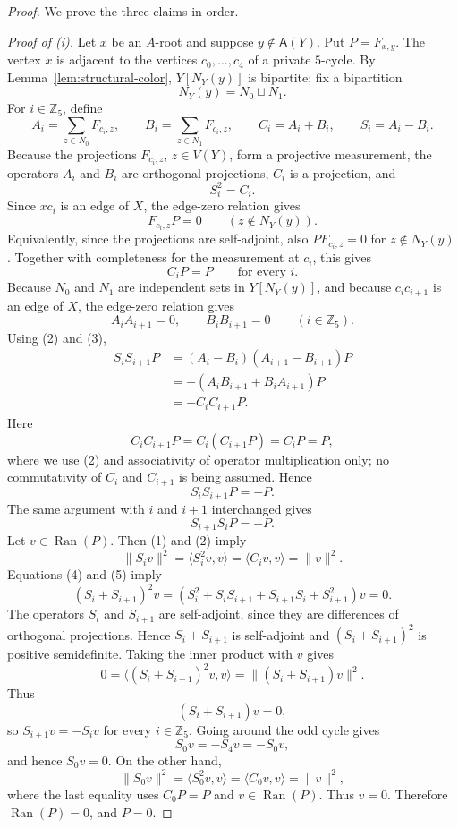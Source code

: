 \documentclass[11pt]{amsart}
\theoremstyle{plain}
\theoremstyle{definition}
\newcommand{\Aset}{\mathsf A}
\begin{document}
\begin{proof}
We prove the three claims in order.

\smallskip
\noindent\emph{Proof of (i).}
Let $x$ be an $A$-root and suppose $y\notin \Aset(Y)$.  Put $P=F_{x,y}$.  The vertex $x$ is adjacent to the vertices $c_0,\ldots,c_4$ of a private $5$-cycle.  By Lemma~\ref{lem:structural-color}, $Y[N_Y(y)]$ is bipartite; fix a bipartition
\[
   N_Y(y)=N_0\sqcup N_1.
\]
For $i\in\mathbb Z_5$, define
\[
   A_i=\sum_{z\in N_0}F_{c_i,z},\qquad
   B_i=\sum_{z\in N_1}F_{c_i,z},\qquad
   C_i=A_i+B_i,\qquad S_i=A_i-B_i.
\]
Because the projections $F_{c_i,z}$, $z\in V(Y)$, form a projective measurement, the operators $A_i$ and $B_i$ are orthogonal projections, $C_i$ is a projection, and
\[
   S_i^2=C_i. \tag{1}
\]
Since $xc_i$ is an edge of $X$, the edge-zero relation gives
\[
   F_{c_i,z}P=0\qquad (z\notin N_Y(y)).
\]
Equivalently, since the projections are self-adjoint, also $PF_{c_i,z}=0$ for $z\notin N_Y(y)$.  Together with completeness for the measurement at $c_i$, this gives
\[
   C_iP=P\qquad\text{for every }i. \tag{2}
\]
Because $N_0$ and $N_1$ are independent sets in $Y[N_Y(y)]$, and because $c_ic_{i+1}$ is an edge of $X$, the edge-zero relation gives
\[
   A_iA_{i+1}=0,
   \qquad
   B_iB_{i+1}=0
   \qquad (i\in\mathbb Z_5). \tag{3}
\]
Using (2) and (3),
\[
\begin{aligned}
   S_iS_{i+1}P
   &=(A_i-B_i)(A_{i+1}-B_{i+1})P\\
   &=-(A_iB_{i+1}+B_iA_{i+1})P\\
   &=-C_iC_{i+1}P.
\end{aligned}
\]
Here
\[
   C_iC_{i+1}P=C_i(C_{i+1}P)=C_iP=P,
\]
where we use (2) and associativity of operator multiplication only; no commutativity of $C_i$ and $C_{i+1}$ is being assumed.  Hence
\[
   S_iS_{i+1}P=-P. \tag{4}
\]
The same argument with $i$ and $i+1$ interchanged gives
\[
   S_{i+1}S_iP=-P. \tag{5}
\]
Let $v\in\operatorname{Ran}(P)$.  Then (1) and (2) imply
\[
   \|S_iv\|^2=\langle S_i^2v,v\rangle=\langle C_iv,v\rangle=\|v\|^2.
\]
Equations (4) and (5) imply
\[
   (S_i+S_{i+1})^2v
   =(S_i^2+S_iS_{i+1}+S_{i+1}S_i+S_{i+1}^2)v=0.
\]
The operators $S_i$ and $S_{i+1}$ are self-adjoint, since they are differences of orthogonal projections.  Hence $S_i+S_{i+1}$ is self-adjoint and $(S_i+S_{i+1})^2$ is positive semidefinite.  Taking the inner product with $v$ gives
\[
   0=\langle (S_i+S_{i+1})^2v,v\rangle
    =\|(S_i+S_{i+1})v\|^2.
\]
Thus
\[
   (S_i+S_{i+1})v=0,
\]
so $S_{i+1}v=-S_iv$ for every $i\in\mathbb Z_5$.  Going around the odd cycle gives
\[
   S_0v=-S_4v=-S_0v,
\]
and hence $S_0v=0$.  On the other hand,
\[
   \|S_0v\|^2=\langle S_0^2v,v\rangle=\langle C_0v,v\rangle=\|v\|^2,
\]
where the last equality uses $C_0P=P$ and $v\in\operatorname{Ran}(P)$.  Thus $v=0$.  Therefore $\operatorname{Ran}(P)=0$, and $P=0$.


\end{proof}
\end{document}
